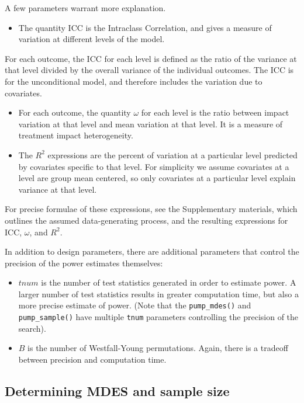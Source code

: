 \documentclass[
]{article}
\providecommand{\tightlist}{%
  \setlength{\itemsep}{0pt}\setlength{\parskip}{0pt}}
\begin{document}
A few parameters warrant more explanation.

\begin{itemize}
\tightlist
\item
  The quantity \(\text{ICC}\) is the Intraclass Correlation, and gives a
  measure of variation at different levels of the model.
\end{itemize}

For each outcome, the ICC for each level is defined as the ratio of the
variance at that level divided by the overall variance of the individual
outcomes. The ICC is for the unconditional model, and therefore includes
the variation due to covariates.

\begin{itemize}
\item
  For each outcome, the quantity \(\omega\) for each level is the ratio
  between impact variation at that level and mean variation at that
  level. It is a measure of treatment impact heterogeneity.
\item
  The \(R^2\) expressions are the percent of variation at a particular
  level predicted by covariates specific to that level. For simplicity
  we assume covariates at a level are group mean centered, so only
  covariates at a particular level explain variance at that level.
\end{itemize}

For precise formulae of these expressions, see the Supplementary
materials, which outlines the assumed data-generating process, and the
resulting expressions for \(\text{ICC}\), \(\omega\), and \(R^2\).

In addition to design parameters, there are additional parameters that
control the precision of the power estimates themselves:

\begin{itemize}
\tightlist
\item
  \(tnum\) is the number of test statistics generated in order to
  estimate power. A larger number of test statistics results in greater
  computation time, but also a more precise estimate of power. (Note
  that the \texttt{pump\_mdes()} and \texttt{pump\_sample()} have
  multiple \texttt{tnum} parameters controlling the precision of the
  search).
\item
  \(B\) is the number of Westfall-Young permutations. Again, there is a
  tradeoff between precision and computation time.
\end{itemize}

\subsection{Determining MDES and sample size}
\label{sec:est_mdes_ss}
\end{document}
